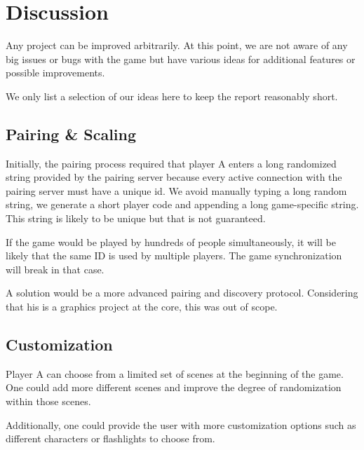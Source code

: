 \documentclass[11pt]{article}
\begin{document}

\section{Discussion}
\par Any project can be improved arbitrarily. At this point, we are not aware of any big issues or bugs with the game but have various ideas for additional features or possible improvements.
\par We only list a selection of our ideas here to keep the report reasonably short.

\subsection{Pairing \& Scaling}
\par Initially, the pairing process required that player A enters a long randomized string provided by the pairing server because every active connection with the pairing server must have a unique id. We avoid manually typing a long random string, we generate a short player code and appending a long game-specific string. This string is likely to be unique but that is not guaranteed.
\par If the game would be played by hundreds of people simultaneously, it will be likely that the same ID is used by multiple players. The game synchronization will break in that case.
\par A solution would be a more advanced pairing and discovery protocol. Considering that his is a graphics project at the core, this was out of scope.

\subsection{Customization}
\par Player A can choose from a limited set of scenes at the beginning of the game. One could add more different scenes and improve the degree of randomization within those scenes.
\par Additionally, one could provide the user with more customization options such as different characters or flashlights to choose from.
\end{document}
